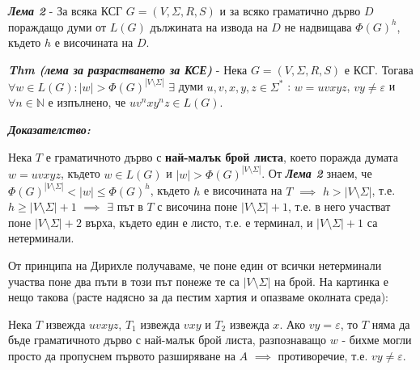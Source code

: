 \documentclass[fleqn,12pt]{article}
\begin{document}
\begin{flushleft}
\textit{\textbf{Лема 2}} - За всяка КСГ $G = (V, \Sigma, R, S)$ и за всяко граматично дърво $D$ пораждащо думи от $L(G)$ дължината на извода на $D$ не надвищава $\Phi(G)^h$, където $h$ е височината на $D$.

\textit{\textbf{Thm (лема за разрастването за КСЕ)}} - Нека $G = (V, \Sigma, R, S)$ е КСГ. 
Тогава $\forall w \in L(G): |w| > \Phi(G)^{|V \setminus \Sigma|}$  $\exists$ думи $u, v, x, y, z \in \Sigma^*$ : $w=uvxyz$, $vy \neq \varepsilon$ и $\forall n \in \mathbb{N}$ е изпълнено, че $uv^nxy^nz \in L(G)$.

\textit{\textbf{Доказателство:}}

Нека $T$ е граматичното дърво с \textbf{най-малък брой листа}, което поражда думата $w = uvxyz$, 
където $w \in L(G)$ и $|w| > \Phi(G)^{|V \setminus \Sigma|}$. 
От \textit{\textbf{Лема 2}} знаем, че $\Phi(G)^{|V \setminus \Sigma|} < |w| \leq \Phi(G)^h$, където $h$ е височината на $T$ $\implies$ $h > |V \setminus \Sigma|$, т.е. $h \geq |V \setminus \Sigma| + 1$ $\implies$ 
$\exists$ път в $T$ с височина поне $|V \setminus \Sigma| + 1$, т.е. в него участват поне $|V \setminus \Sigma| + 2$ върха, където един е листо, т.е. е терминал, и $|V \setminus \Sigma| + 1$ са нетерминали.

От принципа на Дирихле получаваме, че поне един от всички нетерминали участва поне два пъти в този път понеже те са $|V \setminus \Sigma|$ на брой. 
На картинка е нещо такова (расте надясно за да пестим хартия и опазваме околната среда):

\begin{center}
\end{center}


Нека $T$ извежда $uvxyz$, $T_1$ извежда $vxy$ и $T_2$ извежда $x$. 
Ако $vy = \varepsilon$, то $T$ няма да бъде граматичното дърво с най-малък брой листа,
разпознаващо $w$ - бихме могли просто да пропуснем първото разширяване на $A$ $\implies$ противоречие, т.е. $vy \neq \varepsilon$.

\begin{center}
\end{center}


\end{flushleft}
\end{document}
